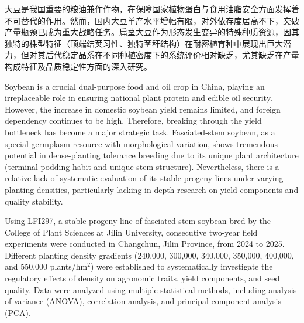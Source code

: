 \documentclass[UTF8,oneside,openany,driverfallback=dvipdfmx,pdfencoding=unicode,hidelinks]{jlutex}
\begin{document}
{}
	\frontmatter
	\setcounter{page}{0}		%
	\pagestyle{empty}%
	\maketitle					%
	
	\setcounter{page}{1}		%
	\pagestyle{myheading}	%

	\begin{cabstract}

		大豆是我国重要的粮油兼作作物，在保障国家植物蛋白与食用油脂安全方面发挥着不可替代的作用。然而，国内大豆单产水平增幅有限，对外依存度居高不下，突破产量瓶颈已成为重大战略任务。扁茎大豆作为形态发生变异的特殊种质资源，因其独特的株型特征（顶端结荚习性、独特茎秆结构）在耐密植育种中展现出巨大潜力，但对其后代稳定品系在不同种植密度下的系统评价相对缺乏，尤其缺乏在产量构成特征及品质稳定性方面的深入研究。

		\end{cabstract}
	
		\begin{eabstract}

		Soybean is a crucial dual-purpose food and oil crop in China, playing an irreplaceable role in ensuring national plant protein and edible oil security. However, the increase in domestic soybean yield remains limited, and foreign dependency continues to be high. Therefore, breaking through the yield bottleneck has become a major strategic task. Fasciated-stem soybean, as a special germplasm resource with morphological variation, shows tremendous potential in dense-planting tolerance breeding due to its unique plant architecture (terminal podding habit and unique stem structure). Nevertheless, there is a relative lack of systematic evaluation of its stable progeny lines under varying planting densities, particularly lacking in-depth research on yield components and quality stability.
	
		Using LFI297, a stable progeny line of fasciated-stem soybean bred by the College of Plant Sciences at Jilin University, consecutive two-year field experiments were conducted in Changchun, Jilin Province, from 2024 to 2025. Different planting density gradients (240,000, 300,000, 340,000, 350,000, 400,000, and 550,000 plants/hm$^2$) were established to systematically investigate the regulatory effects of density on agronomic traits, yield components, and seed quality. Data were analyzed using multiple statistical methods, including analysis of variance (ANOVA), correlation analysis, and principal component analysis (PCA).
		
		\end{eabstract}
	
\end{document}
